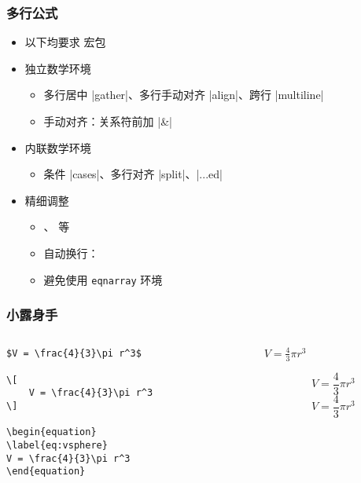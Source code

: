 \begin{frame}[fragile]
\frametitle{多行公式}
\begin{itemize}
  \item 以下均要求  宏包
  \item 独立数学环境

  \begin{itemize}
    \item 多行居中 |gather|、多行手动对齐 |align|、跨行 |multiline|
    \item 手动对齐：关系符前加 |&|
  \end{itemize}

  \item 内联数学环境

  \begin{itemize}
    \item 条件 |cases|、多行对齐 |split|、|...ed|
  \end{itemize} \pause

  \item 精细调整

  \begin{itemize}
    \item {}、 等
    \item 自动换行：
    \item \alert{避免使用 \texttt{eqnarray} 环境}
  \end{itemize}
\end{itemize}
\end{frame}



\begin{frame}[fragile]
    \frametitle{小露身手}

\begin{columns}
\begin{column}{.5\textwidth}
\lstset{language=[LaTeX]TeX}
\begin{lstlisting}[basicstyle=\ttfamily\small]
$V = \frac{4}{3}\pi r^3$

\[
    V = \frac{4}{3}\pi r^3
\]

\begin{equation}
\label{eq:vsphere}
V = \frac{4}{3}\pi r^3
\end{equation}
\end{lstlisting}
\end{column}

\begin{column}{.5\textwidth}
    $V = \frac{4}{3}\pi r^3$

    \[
        V = \frac{4}{3}\pi r^3
    \]
\begin{equation}
\label{eq:vsphere}
    V = \frac{4}{3}\pi r^3
\end{equation}
\end{column}
\end{columns}

\end{frame}


